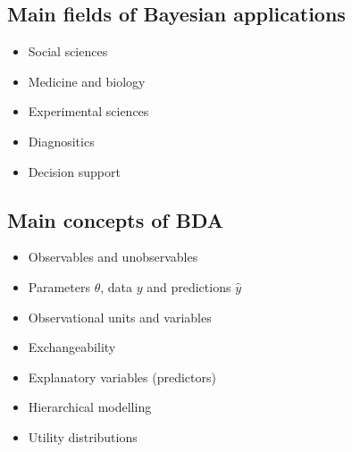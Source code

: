 \documentclass[letterpaper,10pt,english]{jupyterBook}
\begin{document}
\subsection{Main fields of Bayesian applications}
\label{\detokenize{Lecture 1:main-fields-of-bayesian-applications}}\begin{itemize}
\item {} 
\sphinxAtStartPar
Social sciences

\item {} 
\sphinxAtStartPar
Medicine and biology

\item {} 
\sphinxAtStartPar
Experimental sciences

\item {} 
\sphinxAtStartPar
Diagnositics

\item {} 
\sphinxAtStartPar
Decision support

\end{itemize}


\subsection{Main concepts of BDA}
\label{\detokenize{Lecture 1:main-concepts-of-bda}}\begin{itemize}
\item {} 
\sphinxAtStartPar
Observables and unobservables

\item {} 
\sphinxAtStartPar
Parameters \(\theta\), data \(y\) and predictions \(\hat{y}\)

\item {} 
\sphinxAtStartPar
Observational units and variables

\item {} 
\sphinxAtStartPar
Exchangeability

\item {} 
\sphinxAtStartPar
Explanatory variables (predictors)

\item {} 
\sphinxAtStartPar
Hierarchical modelling

\item {} 
\sphinxAtStartPar
Utility distributions

\end{itemize}
\end{document}
